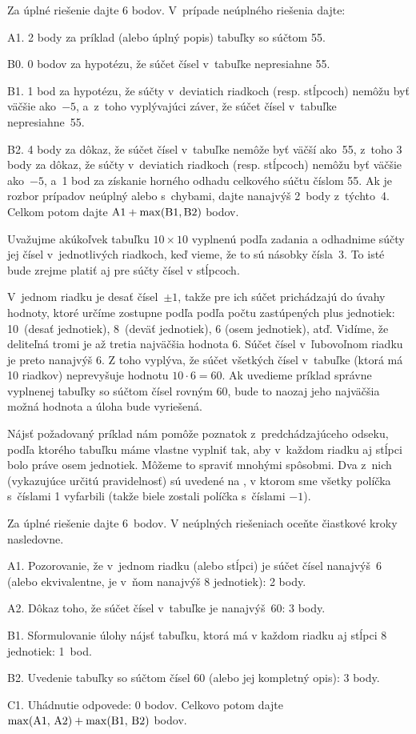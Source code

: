 {\schemaABC
Za úplné riešenie dajte 6 bodov. V~prípade neúplného riešenia dajte:
\item{A1.} 2 body za príklad (alebo úplný popis) tabuľky so súčtom 55.
\item{B0.} 0 bodov za hypotézu, že súčet čísel v~tabuľke nepresiahne 55.
\item{B1.} 1 bod za hypotézu, že súčty v~deviatich riadkoch (resp. stĺpcoch) nemôžu byť väčšie ako~${-5}$, a~z~toho vyplývajúci záver, že súčet čísel v~tabuľke nepresiahne~55.
\item{B2.} 4 body za dôkaz, že súčet čísel v~tabuľke nemôže byť väčší ako~55, z~toho 3 body za dôkaz, že súčty v~deviatich riadkoch (resp. stĺpcoch) nemôžu byť väčšie ako~${-5}$, a~1 bod za získanie horného odhadu celkového súčtu číslom 55. Ak je rozbor prípadov neúplný alebo s~chybami, dajte nanajvýš 2~body z~týchto~4.
\endgraf\noindent
Celkom potom dajte
$\rm{A1}+\max({B1},{B2})$ bodov.
\endschema
}

{%
Uvažujme akúkoľvek tabuľku $10\times10$ vyplnenú podľa zadania a
odhadnime súčty jej čísel v~jednotlivých riadkoch, keď vieme,
že to sú násobky čísla~3. To isté bude zrejme platiť aj pre súčty čísel v stĺpcoch.

V~jednom riadku je desať čísel~$\pm1$, takže pre ich súčet
prichádzajú do úvahy hodnoty, ktoré určíme zostupne podľa podľa
počtu zastúpených plus jednotiek: 10~(desať jednotiek),
8~(deväť jednotiek), 6 (osem jednotiek), atď.
Vidíme, že deliteľná tromi je až tretia najväčšia hodnota 6.
Súčet čísel v~ľubovoľnom riadku je preto nanajvýš 6.
Z toho vyplýva, že súčet všetkých čísel v~tabuľke (ktorá má 10 riadkov)
neprevyšuje hodnotu $10\cdot6=60$.
Ak uvedieme príklad správne vyplnenej tabuľky
so súčtom čísel rovným 60, bude to naozaj jeho
najväčšia možná hodnota a úloha bude vyriešená.

Nájsť požadovaný príklad nám pomôže poznatok z~predchádzajúceho
odseku, podľa ktorého tabuľku máme vlastne vyplniť tak,
aby v~každom riadku aj stĺpci bolo práve osem jednotiek. Môžeme to
spraviť mnohými spôsobmi. Dva z~nich (vykazujúce určitú pravidelnosť)
sú uvedené na \obr{}, v ktorom sme všetky políčka s~číslami 1
vyfarbili (takže biele zostali políčka s~číslami ${-1}$).
%

\schemaABC
Za úplné riešenie dajte 6~bodov. V neúplných riešeniach oceňte čiastkové kroky nasledovne.
\item{A1.} Pozorovanie, že v~jednom riadku (alebo stĺpci) je súčet čísel nanajvýš~6 (alebo ekvivalentne, je v~ňom nanajvýš 8 jednotiek): 2 body.
\item{A2.} Dôkaz toho, že súčet čísel v~tabuľke je nanajvýš~60: 3 body.
\item{B1.} Sformulovanie úlohy nájsť tabuľku, ktorá má v každom riadku aj stĺpci 8 jednotiek: 1~bod.
\item{B2.} Uvedenie tabuľky so súčtom čísel 60 (alebo jej kompletný opis): 3 body.
\item{C1.} Uhádnutie odpovede: 0 bodov.
\endgraf\noindent
Celkovo potom dajte $\rm\max(A1,\,A2)+\max(B1,\,B2)$ bodov.
\endschema
}

